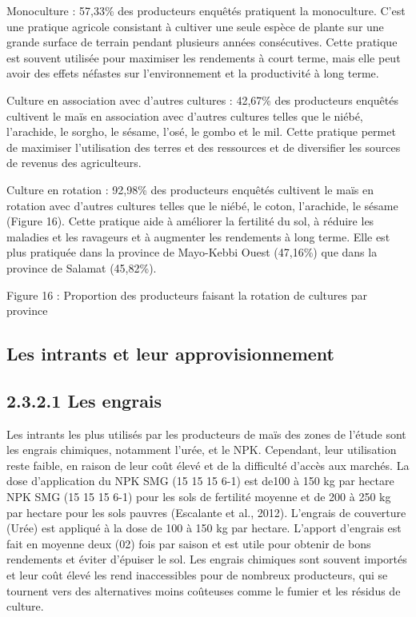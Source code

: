 \documentclass[12pt,oneside]{report}
\begin{document}
Monoculture : 57,33\% des producteurs enquêtés pratiquent la monoculture. C’est une pratique agricole consistant à cultiver une seule espèce de plante sur une grande surface de terrain pendant plusieurs années consécutives. Cette pratique est souvent utilisée pour maximiser les rendements à court terme, mais elle peut avoir des effets néfastes sur l'environnement et la productivité à long terme.

Culture en association avec d'autres cultures : 42,67\% des producteurs enquêtés cultivent le maïs en association avec d'autres cultures telles que le niébé, l'arachide, le sorgho, le sésame, l’osé, le gombo et le mil. Cette pratique permet de maximiser l'utilisation des terres et des ressources et de diversifier les sources de revenus des agriculteurs.

Culture en rotation : 92,98\% des producteurs enquêtés cultivent le maïs en rotation avec d'autres cultures telles que le niébé, le coton, l’arachide, le sésame (Figure 16). Cette pratique aide à améliorer la fertilité du sol, à réduire les maladies et les ravageurs et à augmenter les rendements à long terme. Elle est plus pratiquée dans la province de Mayo-Kebbi Ouest (47,16\%) que dans la province de Salamat (45,82\%).

Figure 16 : Proportion des producteurs faisant la rotation de cultures par province

\subsection{Les intrants et leur approvisionnement}
\subsection{2.3.2.1 Les engrais}
Les intrants les plus utilisés par les producteurs de maïs des zones de l’étude sont les engrais chimiques, notamment l'urée, et le NPK. Cependant, leur utilisation reste faible, en raison de leur coût élevé et de la difficulté d'accès aux marchés. La dose d’application du NPK SMG (15 15 15 6-1) est de100 à 150 kg par hectare NPK SMG (15 15 15 6-1) pour les sols de fertilité moyenne et de 200 à 250 kg par hectare pour les sols pauvres (Escalante et al., 2012). L’engrais de couverture (Urée) est appliqué à la dose de 100 à 150 kg par hectare. L’apport d’engrais est fait en moyenne deux (02) fois par saison et est utile pour obtenir de bons rendements et éviter d’épuiser le sol. Les engrais chimiques sont souvent importés et leur coût élevé les rend inaccessibles pour de nombreux producteurs, qui se tournent vers des alternatives moins coûteuses comme le fumier et les résidus de culture.
\end{document}
